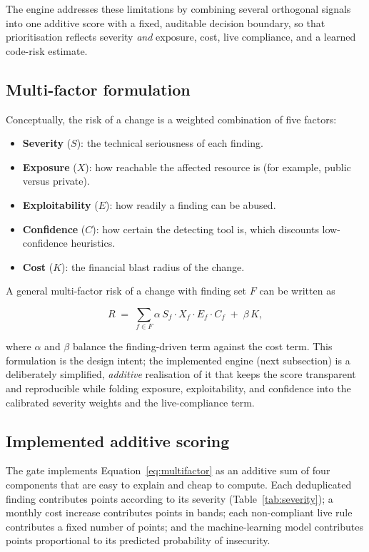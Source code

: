 The engine addresses these limitations by combining several orthogonal signals into one
additive score with a fixed, auditable decision boundary, so that prioritisation reflects
severity \emph{and} exposure, cost, live compliance, and a learned code-risk estimate.

\subsection{Multi-factor formulation}
\label{subsec:rs-formulation}

Conceptually, the risk of a change is a weighted combination of five factors:

\begin{itemize}
    \item \textbf{Severity} ($S$): the technical seriousness of each finding.
    \item \textbf{Exposure} ($X$): how reachable the affected resource is (for example,
    public versus private).
    \item \textbf{Exploitability} ($E$): how readily a finding can be abused.
    \item \textbf{Confidence} ($C$): how certain the detecting tool is, which discounts
    low-confidence heuristics.
    \item \textbf{Cost} ($K$): the financial blast radius of the change.
\end{itemize}

A general multi-factor risk of a change with finding set $F$ can be written as

\begin{equation}
\label{eq:multifactor}
R \;=\; \sum_{f \in F} \alpha\, S_f \cdot X_f \cdot E_f \cdot C_f \;+\; \beta\, K,
\end{equation}

where $\alpha$ and $\beta$ balance the finding-driven term against the cost term. This
formulation is the design intent; the implemented engine (next subsection) is a
deliberately simplified, \emph{additive} realisation of it that keeps the score
transparent and reproducible while folding exposure, exploitability, and confidence into
the calibrated severity weights and the live-compliance term.

\subsection{Implemented additive scoring}
\label{subsec:rs-additive}

The gate implements Equation~\ref{eq:multifactor} as an additive sum of four components
that are easy to explain and cheap to compute. Each deduplicated finding contributes
points according to its severity (Table~\ref{tab:severity}); a monthly cost increase
contributes points in bands; each non-compliant live rule contributes a fixed number of
points; and the machine-learning model contributes points proportional to its predicted
probability of insecurity.

